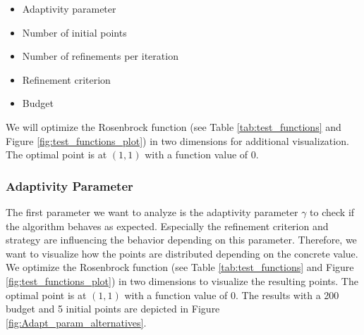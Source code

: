 \begin{itemize}
	\item Adaptivity parameter
	\item Number of initial points
	\item Number of refinements per iteration
	\item Refinement criterion
	\item Budget
\end{itemize}

We will optimize the Rosenbrock function (see Table \ref{tab:test_functions} and Figure \ref{fig:test_functions_plot}) in two dimensions for additional visualization. The optimal point is at $ (1, 1) $ with a function value of 0. 

\subsubsection{Adaptivity Parameter}

The first parameter we want to analyze is the adaptivity parameter $ \gamma $ to check if the algorithm behaves as expected. Especially the refinement criterion and strategy are influencing the behavior depending on this parameter. Therefore, we want to visualize how the points are distributed depending on the concrete value. We optimize the Rosenbrock function (see Table \ref{tab:test_functions} and Figure \ref{fig:test_functions_plot}) in two dimensions to visualize the resulting points. The optimal point is at $ (1, 1) $ with a function value of 0. The results with a 200 budget and 5 initial points are depicted in Figure \ref{fig:Adapt_param_alternatives}.


